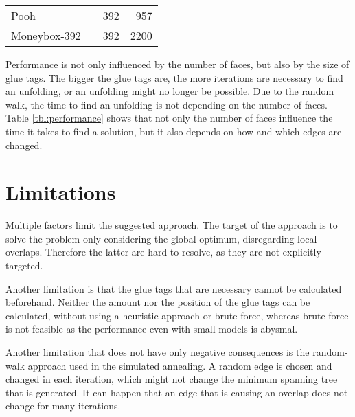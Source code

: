 \documentclass[draft,final]{vutinfth} %
\begin{document}
\begin{tabular}{|ll|r|r|}
Pooh & & 392 & 957 \\
Moneybox-392 & & 392 & 2200 \\
\hline
\end{tabular}
\label{tbl:performance}
\endgroup

Performance is not only influenced by the number of faces, but also by the size of glue tags. The bigger the glue tags are, the more iterations are necessary to find an unfolding, or an unfolding might no longer be possible. Due to the random walk, the time to find an unfolding is not depending on the number of faces. Table \ref{tbl:performance} shows that not only the number of faces influence the time it takes to find a solution, but it also depends on how and which edges are changed.

\section{Limitations}
\label{sec:limitations}

Multiple factors limit the suggested approach. The target of the approach is to solve the problem only considering the global optimum, disregarding local overlaps. Therefore the latter are hard to resolve, as they are not explicitly targeted.

Another limitation is that the glue tags that are necessary cannot be calculated beforehand. Neither the amount nor the position of the glue tags can be calculated, without using a heuristic approach or brute force, whereas brute force is not feasible as the performance even with small models is abysmal.

Another limitation that does not have only negative consequences is the random-walk approach used in the simulated annealing. A random edge is chosen and changed in each iteration, which might not change the minimum spanning tree that is generated. It can happen that an edge that is causing an overlap does not change for many iterations.
\end{document}
